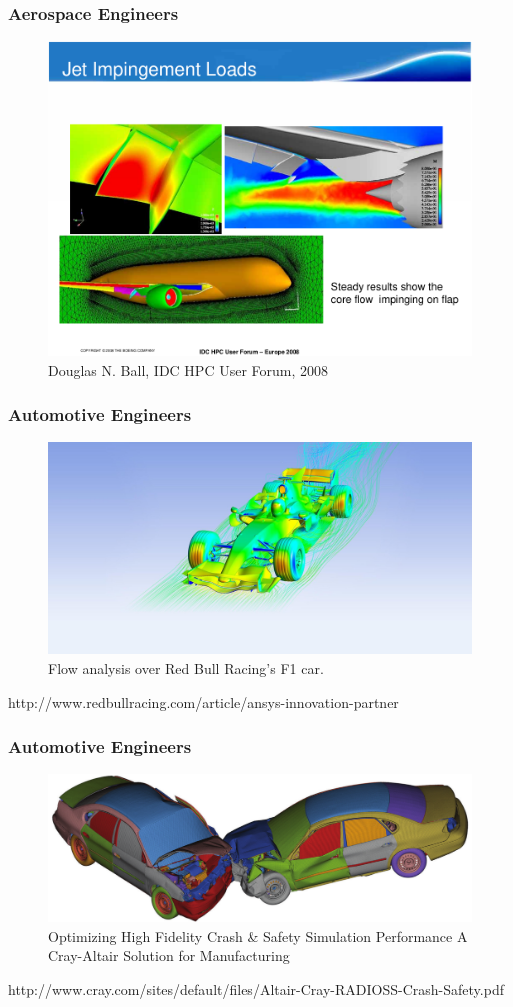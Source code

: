 \documentclass{beamer}
\begin{document}
\begin{frame}
  \frametitle{Aerospace Engineers}
  \begin{figure} \centering
    \includegraphics[width=.8\textwidth]{figs/cfd/boeing-jet-load.png}
    \caption{Douglas N. Ball, IDC HPC User Forum, 2008}
  \end{figure}
\end{frame}

\begin{frame}
  \frametitle{Automotive Engineers}
  \begin{figure} \centering
    \includegraphics[width=.8\textwidth]{figs/cfd/redbull-ansys.jpg}
    \caption{Flow analysis over Red Bull Racing's F1 car.}
  \end{figure}
  {\small http://www.redbullracing.com/article/ansys-innovation-partner}
\end{frame}

\begin{frame}
  \frametitle{Automotive Engineers}
  \begin{figure} \centering
    \includegraphics[width=.8\textwidth]{figs/cfd/altair-cray-crash-test.png}
    \caption{Optimizing High Fidelity Crash \& Safety Simulation Performance
  A Cray-Altair Solution for Manufacturing}
  \end{figure}
  {\small
    http://www.cray.com/sites/default/files/Altair-Cray-RADIOSS-Crash-Safety.pdf
  }
\end{frame}
\end{document}
